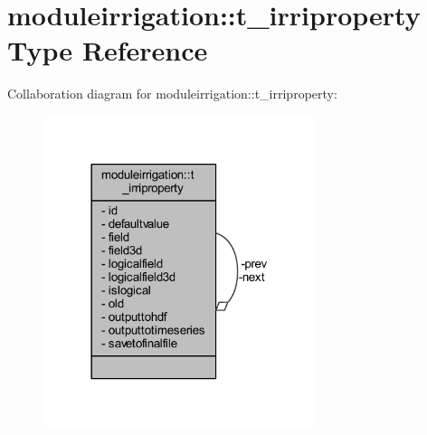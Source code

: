 \hypertarget{structmoduleirrigation_1_1t__irriproperty}{}\section{moduleirrigation\+:\+:t\+\_\+irriproperty Type Reference}
\label{structmoduleirrigation_1_1t__irriproperty}


Collaboration diagram for moduleirrigation\+:\+:t\+\_\+irriproperty\+:\nopagebreak
\begin{figure}[H]
\begin{center}
\leavevmode
\includegraphics[width=225pt]{structmoduleirrigation_1_1t__irriproperty__coll__graph}
\end{center}
\end{figure}
